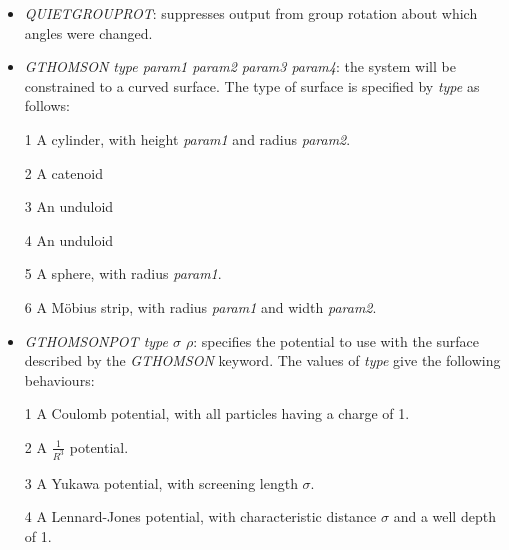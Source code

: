 \documentclass[12pt,a4paper,dvips]{article}
\begin{document}
\begin{itemize}
{\it groupatom2}

{\it groupatom3}

\ldots

The group rotation axis is defined by the vector from {\it bondatom1}->{\it bondatom2}, and the rotation is scaled by {\it rotationscalefactor}
.

Here is an example {\textrm atomgroups} file containing two groups:

{\textrm GROUP OME 6 5 4 1.0 0.8}

{\textrm 1}

{\textrm 2}

{\textrm 3}

{\textrm 4}

{\textrm GROUP CH2OH 23 25 4 1.0 0.8}

{\textrm 26}

{\textrm 27}

{\textrm 28}

{\textrm 29}

\item {\it QUIETGROUPROT}: suppresses output from group rotation about which angles were changed.

\item {\it GTHOMSON type param1 param2 param3 param4}: the system will be constrained to a curved surface.
The type of surface is specified by {\it type} as follows:

1 A cylinder, with height {\it param1} and radius {\it param2}.

2 A catenoid

3 An unduloid

4 An unduloid

5 A sphere, with radius {\it param1}.

6 A M\"{o}bius strip, with radius {\it param1} and width {\it param2}.

\item {\it GTHOMSONPOT type $\sigma$ $\rho$}: specifies the potential to use with the surface described by 
the {\it GTHOMSON} keyword. The values of {\it type} give the following behaviours:

1 A Coulomb potential, with all particles having a charge of 1.

2 A $\frac{\displaystyle 1}{\displaystyle R^{3}}$ potential.

3 A Yukawa potential, with screening length {\it $\sigma$}.

4 A Lennard-Jones potential, with characteristic distance {\it $\sigma$} and a well depth of 1.


\end{itemize}
\end{document}
